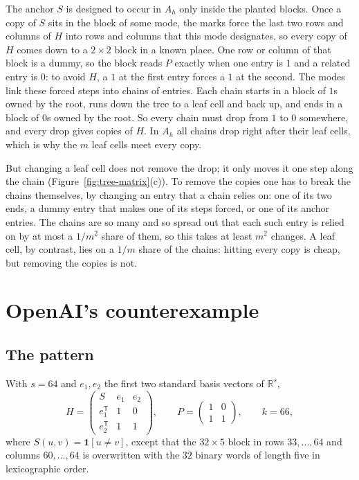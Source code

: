 \documentclass{article}
\theoremstyle{plain}
\theoremstyle{definition}
\begin{document}
  The anchor $S$ is designed to occur in $A_h$ only inside the planted blocks.
  Once a copy of $S$ sits in the block of some mode, the marks force the last
  two rows and columns of $H$ into rows and columns that this mode designates,
  so every copy of $H$ comes down to a $2 \times 2$ block in a known place. One
  row or column of that block is a dummy, so the block reads $P$ exactly when
  one entry is $1$ and a related entry is $0$: to avoid $H$, a $1$ at the first
  entry forces a $1$ at the second. The modes link these forced steps into
  chains of entries. Each chain starts in a block of $1$s owned by the root,
  runs down the tree to a leaf cell and back up, and ends in a block of $0$s
  owned by the root. So every chain must drop from $1$ to $0$ somewhere, and
  every drop gives copies of $H$. In $A_h$ all chains drop right after their
  leaf cells, which is why the $m$ leaf cells meet every copy.

  But changing a leaf cell does not remove the drop; it only moves it one step
  along the chain (Figure~\ref{fig:tree-matrix}(c)). To remove the copies one has
  to break the chains themselves, by changing an entry that a chain relies on:
  one of its two ends, a dummy entry that makes one of its steps forced, or one
  of its anchor entries. The chains are so many and so spread out that each such
  entry is relied on by at most a $1/m^2$ share of them, so this takes at least
  $m^2$ changes. A leaf cell, by contrast, lies on a $1/m$ share of the chains:
  hitting every copy is cheap, but removing the copies is not.


\section*{OpenAI's counterexample}
\label{sec:tour}

\subsection*{The pattern}

With $s=64$ and $e_1,e_2$ the first two standard basis vectors of
$\mathbb R^{s}$,
\begin{equation}\label{eq:H}
  H=\begin{pmatrix} S & e_1 & e_2\\[1pt]
                    e_1^{\mathsf T} & 1 & 0\\[1pt]
                    e_2^{\mathsf T} & 1 & 1\end{pmatrix},
  \qquad
  P=\begin{pmatrix}1&0\\1&1\end{pmatrix},
  \qquad k=66,
\end{equation}
where $S(u,v)=\mathbf 1[u\neq v]$, except that the $32\times5$ block in rows
$33,\dots,64$ and columns $60,\dots,64$ is overwritten with the $32$ binary
words of length five in lexicographic order.
\end{document}
